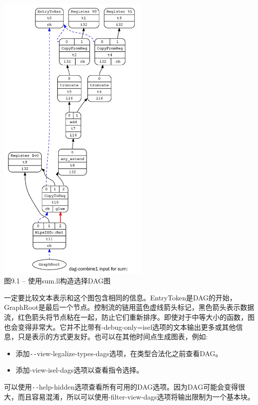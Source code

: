 \hspace*{\fill} \par %
\begin{center}
\includegraphics[width=0.55\textwidth]{content/3/chapter9/images/1.jpg}\\
图9.1 – 使用sum.ll构造选择DAG图
\end{center}

一定要比较文本表示和这个图包含相同的信息。EntryToken是DAG的开始，GraphRoot是最后一个节点。控制流的链用蓝色虚线箭头标记，黑色箭头表示数据流，红色箭头将节点粘在一起，防止它们重新排序。即使对于中等大小的函数，图也会变得非常大。它并不比带有-debug-only=isel选项的文本输出更多或其他信息，只是表示的方式更友好。也可以在其他时间点生成图表，例如:\par

\begin{itemize}
\item 添加\verb|--|view-legalize-types-dags选项，在类型合法化之前查看DAG。
\item 添加-view-isel-dags选项以查看指令选择。
\end{itemize}

可以使用\verb|--|help-hidden选项查看所有可用的DAG选项。因为DAG可能会变得很大，而且容易混淆，所以可以使用-filter-view-dags选项将输出限制为一个基本块。\par

